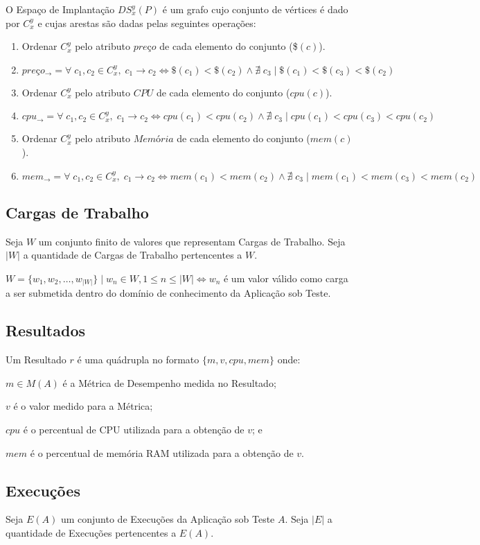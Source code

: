 O Espaço de Implantação $DS_x^y(P)$ é um grafo cujo conjunto de vértices é dado 
por $C_x^y$ e cujas arestas são dadas pelas seguintes operações:

\begin{enumerate}
  \item Ordenar $C_x^y$ pelo atributo $preço$ de cada elemento do conjunto (\$$(c)$).
  \item $preço_{\to} = \forall\; c_1, c_2 \in C_x^y,\; c_1 \to c_2 \iff \$(c_1) < \$(c_2) \land \nexists\; c_3\;|\; \$(c_1) < \$(c_3) < \$(c_2)$
  \item Ordenar $C_x^y$ pelo atributo $CPU$ de cada elemento do conjunto ($cpu(c)$).
  \item $cpu_{\to} = \forall\; c_1, c_2 \in C_x^y,\; c_1 \to c_2 \iff cpu(c_1) < cpu(c_2) \land \nexists\; c_3\;|\; cpu(c_1) < cpu(c_3) < cpu(c_2)$
  \item Ordenar $C_x^y$ pelo atributo $Memória$ de cada elemento do conjunto ($mem(c)$).
  \item $mem_{\to} = \forall\; c_1, c_2 \in C_x^y,\; c_1 \to c_2 \iff mem(c_1) < mem(c_2) \land \nexists\; c_3\;|\; mem(c_1) < mem(c_3) < mem(c_2)$
\end{enumerate}

\subsection{Cargas de Trabalho}
Seja $W$ um conjunto finito de valores que representam Cargas de Trabalho. Seja 
$|W|$ a quantidade de Cargas de Trabalho pertencentes a $W$.

$W = \{w_1, w_2, \dotsc, w_{|W|}\}\; | \; w_n \in W, 1 \leq n \leq |W| \iff w_n $ 
é um valor válido como carga a ser submetida dentro do domínio de conhecimento 
da Aplicação sob Teste.

\subsection{Resultados}
Um Resultado $r$ é uma quádrupla no formato $\{m, v, cpu, mem\}$ onde:

$m \in M(A)$ é a Métrica de Desempenho medida no Resultado;

$v$ é o valor medido para a Métrica;

$cpu$ é o percentual de CPU utilizada para a obtenção de $v$; e

$mem$ é o percentual de memória RAM utilizada para a obtenção de $v$.

\subsection{Execuções}
Seja $E(A)$ um conjunto de Execuções da Aplicação sob Teste $A$. Seja $|E|$ a 
quantidade de Execuções pertencentes a $E(A)$.


